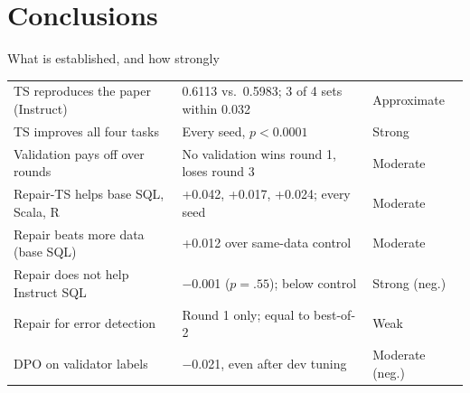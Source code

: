 \documentclass[11pt,aspectratio=169]{beamer}
\begin{document}
\section{Conclusions}

\begin{frame}{What is established, and how strongly}
\vspace{0.05cm}
{\footnotesize\renewcommand{\arraystretch}{1.08}
\begin{tabular}{@{}L{4.9cm}L{5.9cm}>{}L{2.6cm}@{}}
\toprule
{} &  & \\\midrule
TS reproduces the paper (Instruct) & 0.6113 vs.\ 0.5983; 3 of 4 sets within 0.032 & Approximate\\
TS improves all four tasks & Every seed, $p<0.0001$ & Strong\\
Validation pays off over rounds & No validation wins round 1, loses round 3 & Moderate\\
Repair-TS helps base SQL, Scala, R & +0.042, +0.017, +0.024; every seed & Moderate\\
Repair beats more data (base SQL) & +0.012 over same-data control & Moderate\\
Repair does not help Instruct SQL & $-$0.001 ($p=.55$); below control & Strong (neg.)\\
Repair for error detection & Round 1 only; equal to best-of-2 & Weak\\
DPO on validator labels & $-$0.021, even after dev tuning & Moderate (neg.)\\
\bottomrule
\end{tabular}}
\vspace{0.15cm}

\end{frame}
\end{document}
